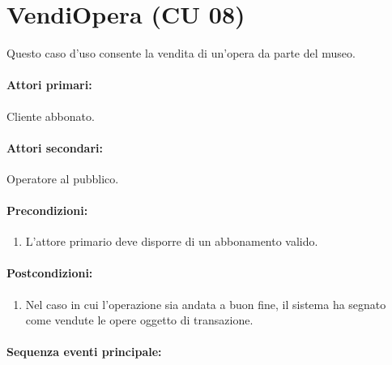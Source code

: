 \documentclass{article}
\begin{document}
\pagebreak 

		\section*{VendiOpera (CU 08)}
	
	\indent\indent Questo caso d'uso consente la vendita di un'opera da parte del museo.
	
	\paragraph{Attori primari:}Cliente abbonato.
	
	\paragraph{Attori secondari:}Operatore al pubblico.
	
	\paragraph{Precondizioni:}
			\begin{enumerate}	[itemsep=8pt,parsep=0pt]
				\item L'attore primario deve disporre di un abbonamento valido.
  			\end{enumerate}	
	
	\paragraph{Postcondizioni:}
			\begin{enumerate}	[itemsep=8pt,parsep=0pt]
				\item  Nel caso in cui l'operazione sia andata a buon fine, il sistema ha segnato come vendute le opere oggetto di transazione.
  			\end{enumerate}	
	
	\paragraph{Sequenza eventi principale:}
\end{document}
